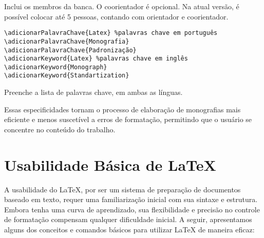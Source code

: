\begin{itemize}
Inclui os membros da banca. O coorientador é opcional. Na atual versão, é possível colocar até 5 pessoas, contando com orientador e coorientador.

\begin{verbatim}
\adicionarPalavraChave{Latex} %palavras chave em português
\adicionarPalavraChave{Monografia}
\adicionarPalavraChave{Padronização}
\adicionarKeyword{Latex} %palavras chave em inglês
\adicionarKeyword{Monograph}
\adicionarKeyword{Standartization}
     \end{verbatim}

Preenche a lista de palavras chave, em ambas as línguas.




\end{itemize}

Essas especificidades tornam o processo de elaboração de monografias mais eficiente e menos suscetível a erros de formatação, permitindo que o usuário se concentre no conteúdo do trabalho.

\section{Usabilidade Básica de LaTeX}

A usabilidade do LaTeX, por ser um sistema de preparação de documentos baseado em texto, requer uma familiarização inicial com sua sintaxe e estrutura. Embora tenha uma curva de aprendizado, sua flexibilidade e precisão no controle de formatação compensam qualquer dificuldade inicial. A seguir, apresentamos alguns dos conceitos e comandos básicos para utilizar LaTeX de maneira eficaz:

